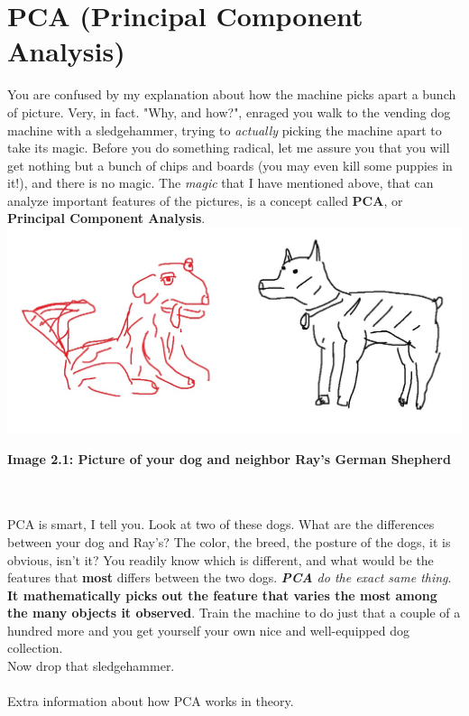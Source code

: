 \documentclass{article}
\begin{document}
\section{PCA (Principal Component Analysis)}
You are confused by my explanation about how the machine picks apart a bunch of picture. Very, in fact. "Why, and how?", enraged you walk to the vending dog machine with a sledgehammer, trying to \textit{actually} picking the machine apart to take its magic. Before you do something radical, let me assure you that you will get nothing but a bunch of chips and boards (you may even kill some puppies in it!), and there is no magic. The \textit{magic} that I have mentioned above, that can analyze important features of the pictures, is a concept called \textbf{PCA}, or \textbf{Principal Component Analysis}. \\
\includegraphics[scale=0.4]{img2}\\
\centerline{\small{\textbf{Image 2.1: Picture of your dog and neighbor Ray's German Shepherd}}}	\\\\
\tab\tab PCA is smart, I tell you. Look at two of these dogs. What are the differences between your dog and Ray's? The color, the breed, the posture of the dogs, it is obvious, isn't it? You readily know which is different, and what would be the features that \textbf{most} differs between the two dogs. \textit{\textbf{PCA} do the exact same thing}. \textbf {It mathematically picks out the feature that varies the most among the many objects it observed}. Train the machine to do just that a couple of a hundred more and you get yourself your own nice and well-equipped dog collection.\\\tab\tab Now drop that sledgehammer.\\\\
\tab\tab Extra information about how PCA works in theory.\\
\end{document}

